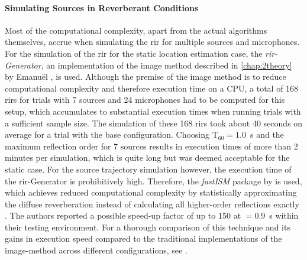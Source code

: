 \paragraph{Simulating Sources in Reverberant Conditions}
Most of the computational complexity, apart from the actual algorithms themselves, accrue when simulating the \gls{rir} for multiple sources and microphones. For the simulation of the \gls{rir} for the static location estimation case, the \emph{\gls{rir}-Generator}, an implementation of the image method described in \autoref{chap:2theory} by Emanuël \citet*{Habets2014}, is used. Although the premise of the image method is to reduce computational complexity and therefore execution time on a CPU, a total of 168 \glspl{rir} for trials with 7 sources and 24 microphones had to be computed for this setup, which accumulates to substantial execution times when running trials with a sufficient sample size. The simulation of these 168 \glspl{rir} took about 40 seconds on average for a trial with the base configuration. Choosing T$_{60}=1.0$~s and the maximum reflection order for 7 sources results in execution times of more than 2 minutes per simulation, which is quite long but was deemed acceptable for the static case. For the source trajectory simulation however, the execution time of the \gls{rir}-Generator is prohibitively high. Therefore, the \emph{fastISM} package \cite{Lehmann2012} by \citeauthor{Lehmann2010} is used, which achieves reduced computational complexity by statistically approximating the diffuse reverberation instead of calculating all higher-order reflections exactly \cite{Lehmann2008,Lehmann2010}. The authors reported a possible speed-up factor of up to 150 at \Tsixty$=0.9$~s within their testing environment. For a thorough comparison of this technique and its gains in execution speed compared to the traditional implementations of the image-method across different configurations, see \cite{Lehmann2010}.